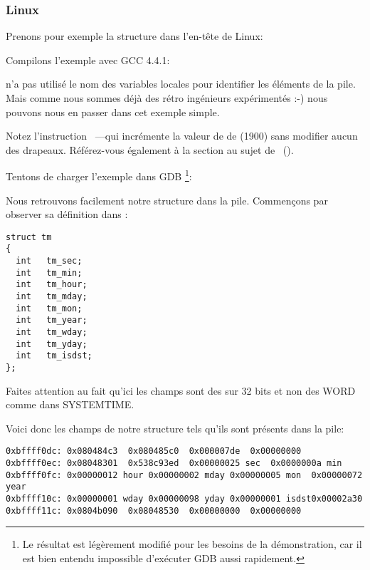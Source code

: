 ﻿\subsubsection{Linux}

Prenons pour exemple la structure  dans l'en-tête  de Linux:



Compilons l'exemple avec GCC 4.4.1:



\IDA n'a pas utilisé le nom des variables locales pour identifier les éléments de la pile.
Mais comme nous sommes déjà des rétro ingénieurs expérimentés :-) nous pouvons nous en passer dans
cet exemple simple.


Notez l'instruction ~---qui incrémente la valeur de \EAX de  (1900)
sans modifier aucun des drapeaux. Référez-vous également à la section au sujet de \LEA{}~().


Tentons de charger l'exemple dans GDB \footnote{Le résultat  est légèrement modifié pour
les besoins de la démonstration, car il est bien entendu impossible d'exécuter GDB aussi rapidement.}:



Nous retrouvons facilement notre structure dans la pile. Commençons par observer sa définition dans
:

\begin{lstlisting}[caption=time.h, label=struct_tm,style=customc]
struct tm
{
  int	tm_sec;
  int	tm_min;
  int	tm_hour;
  int	tm_mday;
  int	tm_mon;
  int	tm_year;
  int	tm_wday;
  int	tm_yday;
  int	tm_isdst;
};
\end{lstlisting}

Faites attention au fait qu'ici les champs sont des \Tint sur 32 bits et non des WORD comme dans
SYSTEMTIME.

Voici donc les champs de notre structure tels qu'ils sont présents dans la pile:

\begin{lstlisting}
0xbffff0dc:	0x080484c3	0x080485c0	0x000007de	0x00000000
0xbffff0ec:	0x08048301	0x538c93ed	0x00000025 sec	0x0000000a min
0xbffff0fc:	0x00000012 hour	0x00000002 mday	0x00000005 mon 	0x00000072 year
0xbffff10c:	0x00000001 wday	0x00000098 yday	0x00000001 isdst0x00002a30
0xbffff11c:	0x0804b090	0x08048530	0x00000000	0x00000000
\end{lstlisting}

